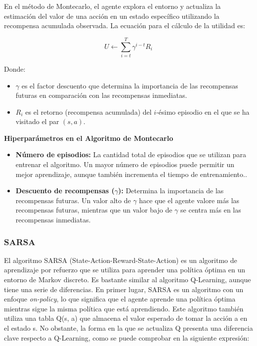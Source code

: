 \documentclass[conference,a4paper]{IEEEtran}
\begin{document}
En el método de Montecarlo, el agente explora el entorno y actualiza la estimación del valor de una acción en un estado específico utilizando la recompensa acumulada observada. La ecuación para el cálculo de la utilidad es:

\[
U \leftarrow \sum_{i=t}^{T} \gamma^{i-t} R_i
\]


Donde:
\begin{itemize}
    \item \(\gamma\) es el factor descuento que determina la importancia de las recompensas futuras en comparación con las recompensas inmediatas.
    \item \(R_i\) es el retorno (recompensa acumulada) del \(i\)-ésimo episodio en el que se ha visitado el par \((s, a)\).\newline
\end{itemize}

\textbf{Hiperparámetros en el Algoritmo de Montecarlo}
\begin{itemize}
  \item \textbf{Número de episodios:} La cantidad total de episodios que se utilizan para entrenar el algoritmo. Un mayor número de episodios puede permitir un mejor aprendizaje, aunque también incrementa el tiempo de entrenamiento..
  \item \textbf{Descuento de recompensas (\(\gamma\)):}  Determina la importancia de las recompensas futuras. Un valor alto de \(\gamma\) hace que el agente valore más las recompensas futuras, mientras que un valor bajo de \(\gamma\) se centra más en las recompensas inmediatas.
\end{itemize}


\subsubsection{\textbf{SARSA}}
El algoritmo SARSA (State-Action-Reward-State-Action) es un algoritmo de aprendizaje por refuerzo que se utiliza para aprender una política óptima en un entorno de Markov discreto. Es bastante similar al algoritmo Q-Learning, 
aunque tiene una serie de diferencias. En primer lugar, SARSA es un algoritmo con un enfoque \textit{on-policy}, lo que significa 
que el agente aprende una política óptima mientras sigue la misma política que está aprendiendo. Este algoritmo también utiliza una tabla Q(s, a) que almacena el valor esperado de tomar la acción a en el estado s. No obstante, 
la forma en la que se actualiza Q presenta una diferencia clave respecto a Q-Learning, como se puede comprobar en la siguiente expresión:
\end{document}
